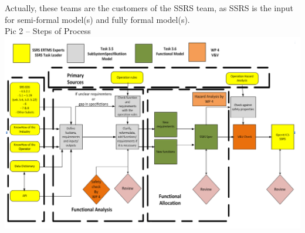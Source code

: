 \documentclass{template/openetcs_article}
\begin{document}
Actually, these teams are the customers of the SSRS team, as SSRS is the input for semi-formal model(s) and fully formal model(s).\\
\newpage
Pic 2 – Steps of Process\\
 \includegraphics[width=15cm]{figs/Steps_of_Process}
 \\
 
\end{document}
